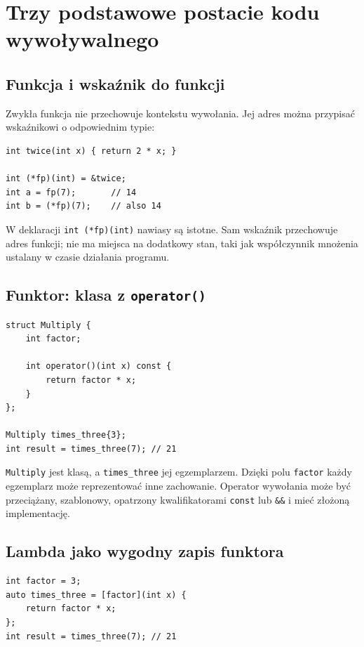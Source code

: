 \section{Trzy podstawowe postacie kodu wywoływalnego}
\label{sec:callables-forms}

\subsection{Funkcja i wskaźnik do funkcji}

Zwykła funkcja nie przechowuje kontekstu wywołania. Jej adres można
przypisać wskaźnikowi o odpowiednim typie:

\begin{lstlisting}
int twice(int x) { return 2 * x; }

int (*fp)(int) = &twice;
int a = fp(7);       // 14
int b = (*fp)(7);    // also 14
\end{lstlisting}

W deklaracji \texttt{int (*fp)(int)} nawiasy są istotne. Sam wskaźnik
przechowuje adres funkcji; nie ma miejsca na dodatkowy stan, taki jak
współczynnik mnożenia ustalany w czasie działania programu.

\subsection{Funktor: klasa z \texttt{operator()}}

\begin{lstlisting}
struct Multiply {
    int factor;

    int operator()(int x) const {
        return factor * x;
    }
};

Multiply times_three{3};
int result = times_three(7); // 21
\end{lstlisting}

\texttt{Multiply} jest klasą, a \texttt{times\_three} jej egzemplarzem.
Dzięki polu \texttt{factor} każdy egzemplarz może reprezentować inne
zachowanie. Operator wywołania może być przeciążany, szablonowy,
opatrzony kwalifikatorami \texttt{const} lub \texttt{\&\&} i mieć
złożoną implementację.

\subsection{Lambda jako wygodny zapis funktora}

\begin{lstlisting}
int factor = 3;
auto times_three = [factor](int x) {
    return factor * x;
};
int result = times_three(7); // 21
\end{lstlisting}

